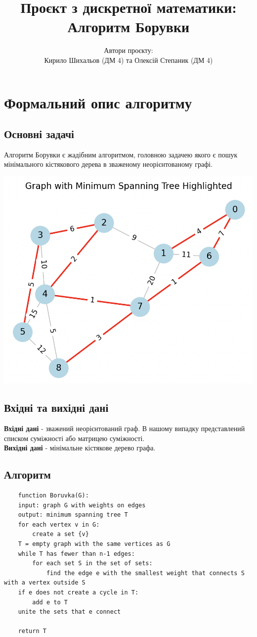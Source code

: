 \documentclass[12pt, letterpaper, twoside]{article}
\title{Проєкт з дискретної математики: 
	Алгоритм Борувки}
\author{Автори проєкту: \\
Кирило Шихальов (ДМ 4) та Олексій Степаник (ДМ 4)}
\date{}
\begin{document}
\maketitle
\section{Формальний опис алгоритму}
\subsection{Основні задачі}
Алгоритм Борувки є жадібним алгоритмом, головною задачею якого є пошук мінімального кістякового дерева в зваженому неорієнтованому графі.

\includegraphics{graph.png}
\subsection{Вхідні та вихідні дані}

\textbf{Вхідні дані} - зважений неорієнтований граф. В нашому випадку представлений списком суміжності або матрицею суміжності.\\
\textbf{Вихідні дані} - мінімальне кістякове дерево графа.

\subsection{Алгоритм}
\begin{verbatim}	
	function Boruvka(G):
	input: graph G with weights on edges
	output: minimum spanning tree T
	for each vertex v in G:
		create a set {v}
	T = empty graph with the same vertices as G
	while T has fewer than n-1 edges:
		for each set S in the set of sets:
			find the edge e with the smallest weight that connects S with a vertex outside S
	if e does not create a cycle in T:
		add e to T
	unite the sets that e connect
	
	return T
\end{verbatim}
\end{document}
